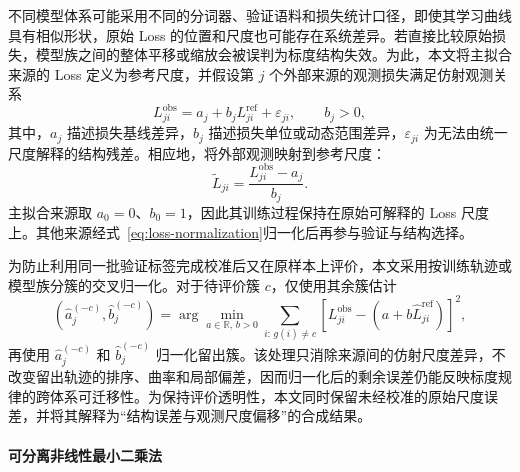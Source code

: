 \documentclass[bwprint]{gmcmthesis}
\begin{document}
不同模型体系可能采用不同的分词器、验证语料和损失统计口径，即使其学习曲线具有相似形状，原始 Loss 的位置和尺度也可能存在系统差异。若直接比较原始损失，模型族之间的整体平移或缩放会被误判为标度结构失效。为此，本文将主拟合来源的 Loss 定义为参考尺度，并假设第 $j$ 个外部来源的观测损失满足仿射观测关系
\begin{equation}
    L_{ji}^{\mathrm{obs}}
    =a_j+b_j L_{ji}^{\mathrm{ref}}+\varepsilon_{ji},
    \qquad b_j>0,
    \label{eq:loss-affine-map}
\end{equation}
其中，$a_j$ 描述损失基线差异，$b_j$ 描述损失单位或动态范围差异，$\varepsilon_{ji}$ 为无法由统一尺度解释的结构残差。相应地，将外部观测映射到参考尺度：
\begin{equation}
    \widetilde L_{ji}
    =\frac{L_{ji}^{\mathrm{obs}}-a_j}{b_j}.
    \label{eq:loss-normalization}
\end{equation}
主拟合来源取 $a_0=0$、$b_0=1$，因此其训练过程保持在原始可解释的 Loss 尺度上。其他来源经式~\eqref{eq:loss-normalization}归一化后再参与验证与结构选择。

为防止利用同一批验证标签完成校准后又在原样本上评价，本文采用按训练轨迹或模型族分簇的交叉归一化。对于待评价簇 $c$，仅使用其余簇估计
\begin{equation}
    (\widehat a_j^{(-c)},\widehat b_j^{(-c)})
    =\arg\min_{a\in\mathbb R,\,b>0}
    \sum_{i:\,g(i)\neq c}
    \left[L_{ji}^{\mathrm{obs}}-
        \left(a+b\widehat L_{ji}^{\mathrm{ref}}\right)\right]^2,
    \label{eq:cross-fitted-normalization}
\end{equation}
再使用 $\widehat a_j^{(-c)}$ 和 $\widehat b_j^{(-c)}$ 归一化留出簇。该处理只消除来源间的仿射尺度差异，不改变留出轨迹的排序、曲率和局部偏差，因而归一化后的剩余误差仍能反映标度规律的跨体系可迁移性。为保持评价透明性，本文同时保留未经校准的原始尺度误差，并将其解释为“结构误差与观测尺度偏移”的合成结果。

\paragraph{可分离非线性最小二乘法}
\end{document}

